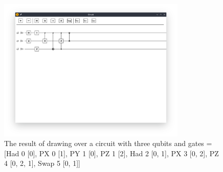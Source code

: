 \documentclass[a4paper,10pt, titlepage, twoside]{article}
\begin{document}
\begin{figure}[H]
    \centering
    \includegraphics[width=0.8\textwidth]{examplecircuit}
    \caption{The result of drawing over a circuit with three qubits and gates = [Had 0 [0], PX 0 [1], PY 1 [0], PZ 1 [2], Had 2 [0, 1], PX 3 [0, 2], PZ 4 [0, 2, 1], Swap 5 [0, 1]]}
\end{figure}
\end{document}
